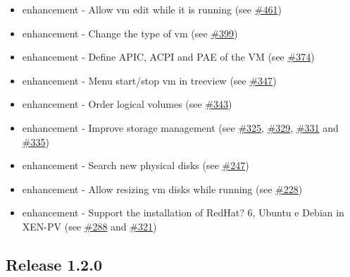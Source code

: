 \begin{itemize}
\item enhancement - Allow vm edit while it is running (see \href{https://srcmaster.eurotux.com/pm/p/etva/ticket/461}{\#461})
\item enhancement - Change the type of vm (see \href{https://srcmaster.eurotux.com/pm/p/etva/ticket/399}{\#399})
\item enhancement - Define APIC, ACPI and PAE of the VM (see \href{https://srcmaster.eurotux.com/pm/p/etva/ticket/374}{\#374})
\item enhancement - Menu start/stop vm in treeview (see \href{https://srcmaster.eurotux.com/pm/p/etva/ticket/347}{\#347})
\item enhancement - Order logical volumes (see \href{https://srcmaster.eurotux.com/pm/p/etva/ticket/343}{\#343})
\item enhancement - Improve storage management (see \href{https://srcmaster.eurotux.com/pm/p/etva/ticket/325}{\#325}, \href{https://srcmaster.eurotux.com/pm/p/etva/ticket/329}{\#329}, \href{https://srcmaster.eurotux.com/pm/p/etva/ticket/331}{\#331} and \href{https://srcmaster.eurotux.com/pm/p/etva/ticket/335}{\#335})
\item enhancement - Search new physical disks (see \href{https://srcmaster.eurotux.com/pm/p/etva/ticket/247}{\#247})
\item enhancement - Allow resizing vm disks while running (see \href{https://srcmaster.eurotux.com/pm/p/etva/ticket/228}{\#228})
\item enhancement - Support the installation of RedHat? 6, Ubuntu e Debian in XEN-PV (see \href{https://srcmaster.eurotux.com/pm/p/etva/ticket/288}{\#288} and \href{https://srcmaster.eurotux.com/pm/p/etva/ticket/321}{\#321})
\end{itemize}

\subsection{Release 1.2.0}

